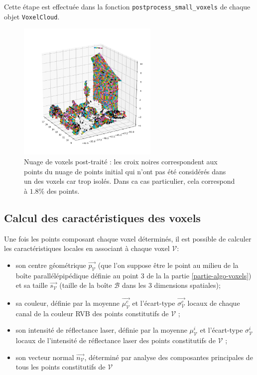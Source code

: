 \documentclass[a4paper, onecolumn, 11pt]{article}
\newcommand{\V}{\mathcal{V}}
\begin{document}
Cette étape est effectuée dans la fonction \texttt{postprocess\_small\_voxels} de chaque objet \texttt{VoxelCloud}.

\begin{figure}[h]
    \centering
    \includegraphics[width=0.6\textwidth]{fig/with_unassociated_points.png}
    \caption{Nuage de voxels post-traité : les croix noires correspondent aux points du nuage de points initial qui n'ont pas été considérés dans un des voxels car trop isolés. Dans ca cas particulier, cela correspond à $1.8\%$ des points.}
    \label{fig:non-associes}
\end{figure}

\subsection{Calcul des caractéristiques des voxels}
Une fois les points composant chaque voxel déterminés, il est possible de calculer les caractéristiques locales en associant à chaque voxel $\V$:

\begin{itemize}
\item son centre géométrique $\overrightarrow{p_\V}$ (que l'on suppose être le point au milieu de la boîte parallélépipédique définie au point 3 de la la partie \ref{partie-algo-voxels}) et sa taille $\overrightarrow{s_\V}$ (taille de la boîte $\mathcal{B}$ dans les 3 dimensions spatiales);
\item sa couleur, définie par la moyenne $\overrightarrow{\mu_\V^c}$ et l'écart-type $\overrightarrow{\sigma_\V^c}$ locaux de chaque canal de la couleur RVB des points constitutifs de $\mathcal{V}$ ;
\item son intensité de réflectance laser, définie par la moyenne $\mu_\V^i$ et l'écart-type $\sigma_\V^i$ locaux de l'intensité de réflectance laser des points constitutifs de $\mathcal{V}$ ;
\item son vecteur normal $\overrightarrow{n_\V}$, déterminé par analyse des composantes principales de tous les points constitutifs de $\mathcal{V}$
\end{itemize}
\end{document}
